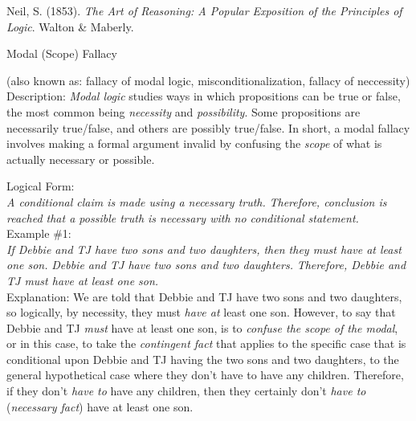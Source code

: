 \documentclass[a4paper,12pt,single,pdftex]{scrartcl}
\begin{document}
      
        
          Neil, S. (1853). {\it The Art of Reasoning: A Popular Exposition of the Principles of Logic}. Walton \& Maberly.
        
      
    
  

Modal (Scope) Fallacy
    
      (also known as: fallacy of modal logic, misconditionalization, fallacy of neccessity)
    \\

  
    Description: {\it Modal logic} studies ways in which propositions can be true or false, the most common being {\it necessity} and {\it possibility}.  Some propositions are necessarily true/false, and others are possibly true/false.  In short, a modal fallacy involves making a formal argument invalid by confusing the {\it scope} of what is actually necessary or possible.

    
      Logical Form:
    \\

    
      {\em A conditional claim is made using a necessary truth.} \newline
{\em Therefore, conclusion is reached that a possible truth is necessary with no conditional statement.}
    \\

    
      Example \#1:
    \\

    
      {\em If Debbie and TJ have two sons and two daughters, then they must have at least one son.} \newline
{\em Debbie and TJ have two sons and two daughters.} \newline
{\em Therefore, Debbie and TJ must have at least one son.}
    \\

    
      Explanation: We are told that Debbie and TJ have two sons and two daughters, so logically, by necessity, they must {\it have at} least one son.  However, to say that Debbie and TJ {\it must} have at least one son, is to {\it confuse the scope of the modal}, or in this case, to take the {\it contingent fact} that applies to the specific case that is conditional upon Debbie and TJ having the two sons and two daughters, to the general hypothetical case where they don’t have to have any children.  Therefore, if they don’t {\it have to} have any children, then they certainly don’t {\it have to} ({\it necessary fact}) have at least one son.
    \\
\end{document}
